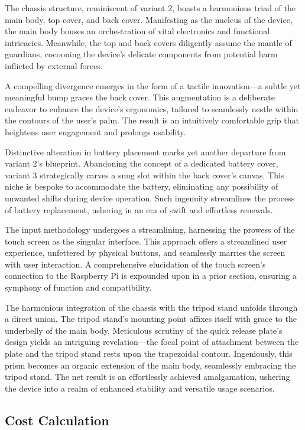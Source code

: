 The chassis structure, reminiscent of variant 2, boasts a harmonious triad of the main body, top cover, and back cover. Manifesting as the nucleus of the device, the main body houses an orchestration of vital electronics and functional intricacies. Meanwhile, the top and back covers diligently assume the mantle of guardians, cocooning the device's delicate components from potential harm inflicted by external forces.

A compelling divergence emerges in the form of a tactile innovation—a subtle yet meaningful bump graces the back cover. This augmentation is a deliberate endeavor to enhance the device's ergonomics, tailored to seamlessly nestle within the contours of the user's palm. The result is an intuitively comfortable grip that heightens user engagement and prolongs usability.

Distinctive alteration in battery placement marks yet another departure from variant 2's blueprint. Abandoning the concept of a dedicated battery cover, variant 3 strategically carves a snug slot within the back cover's canvas. This niche is bespoke to accommodate the battery, eliminating any possibility of unwanted shifts during device operation. Such ingenuity streamlines the process of battery replacement, ushering in an era of swift and effortless renewals.

The input methodology undergoes a streamlining, harnessing the prowess of the touch screen as the singular interface. This approach offers a streamlined user experience, unfettered by physical buttons, and seamlessly marries the screen with user interaction. A comprehensive elucidation of the touch screen's connection to the Raspberry Pi is expounded upon in a prior section, ensuring a symphony of function and compatibility.

The harmonious integration of the chassis with the tripod stand unfolds through a direct union. The tripod stand's mounting point affixes itself with grace to the underbelly of the main body. Meticulous scrutiny of the quick release plate's design yields an intriguing revelation—the focal point of attachment between the plate and the tripod stand rests upon the trapezoidal contour. Ingeniously, this prism becomes an organic extension of the main body, seamlessly embracing the tripod stand. The net result is an effortlessly achieved amalgamation, ushering the device into a realm of enhanced stability and versatile usage scenarios.

\subsection{Cost Calculation}

